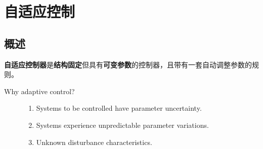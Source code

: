 \chapter{自适应控制}\label{cp4}
\section{概述}\label{4Aref}




\begin{definition}[自适应控制器]
    \textbf{自适应控制器}是\textbf{结构固定}但具有\textbf{可变参数}的控制器，且带有一套自动调整参数的规则。
  \end{definition}
  
  \begin{description}
    \item[Why adaptive control?]
    \begin{enumerate}
      \item Systems to be controlled have {\textsf{parameter uncertainty}}.
      
      \item Systems experience {\textsf{unpredictable parameter variations}}.
      
      \item Unknown {\textsf{disturbance characteristics}}.
    \end{enumerate}
  \end{description}
  
